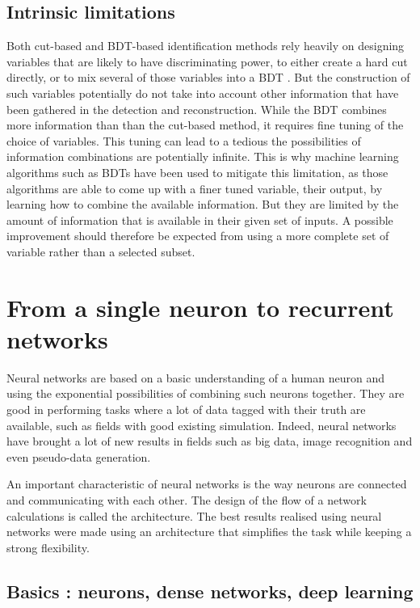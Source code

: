 \subsection{Intrinsic limitations}

Both cut-based and BDT-based identification methods rely heavily on designing variables that are likely to have discriminating power, to either create a hard cut directly, or to mix several of those variables into a BDT . But the construction of such variables potentially do not take into account other information that have been gathered in the detection and reconstruction.
While the BDT combines more information than than the cut-based method, it requires fine tuning of the choice of variables. This tuning can lead to a tedious  the possibilities of information combinations are potentially infinite. This is why machine learning algorithms such as BDTs have been used to mitigate this limitation, as those algorithms are able to come up with a finer tuned variable, their output, by learning how to combine the available information.
But they are limited by the amount of information that is available in their given set of inputs. 
A possible improvement should therefore be expected from using a more complete set of variable rather than a selected subset.


\section{From a single neuron to recurrent networks}
\label{sec:NN}
Neural networks are based on a basic understanding of a human neuron and using the exponential possibilities of combining such neurons together.
They are good in performing tasks where a lot of data tagged with their truth are available, such as fields with good existing simulation.
Indeed, neural networks have brought a lot of new results in fields such as big data, image recognition and even pseudo-data generation.

An important characteristic of neural networks is the way neurons are connected and communicating with each other. The design of the flow of a network calculations is called the architecture. The best results realised using neural networks were made using an architecture that simplifies the task while keeping a strong flexibility.

\subsection{Basics : neurons, dense networks, deep learning}

